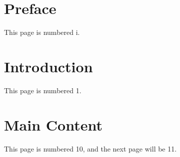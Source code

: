 \documentclass{article}
\begin{document}
	\section*{Preface}
	This page is numbered i.
	
	\newpage
	\section{Introduction}
	This page is numbered 1.
	
	\newpage
	\setcounter{page}{10}              %
	\section{Main Content}
	This page is numbered 10, and the next page will be 11.
\end{document}
